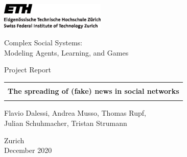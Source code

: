 
\thispagestyle{empty}

\begin{center}
\includegraphics[width=5cm]{ETHlogo.eps}

\bigskip


\bigskip


\bigskip


\LARGE{ 	Complex Social Systems:\\ }
\LARGE{     Modeling Agents, Learning, and Games}

\bigskip

\bigskip

\small{Project Report}\\

\bigskip

\bigskip

\bigskip

\bigskip


\begin{tabular}{|c|}
\hline
\\
\textbf{\LARGE{The spreading of (fake) news in social networks}}\\
\\
\hline
\end{tabular}
\bigskip

\bigskip

\bigskip

\LARGE{Flavio Dalessi, Andrea Musso, Thomas Rupf,\\ }
\LARGE{Julian Schuhmacher, Tristan Strumann}



\bigskip

\bigskip

\bigskip

\bigskip

\bigskip

\bigskip

\bigskip

\bigskip

Zurich\\
December 2020\\

\end{center}


